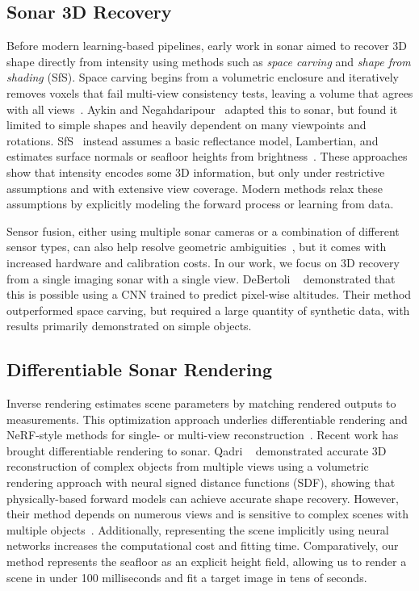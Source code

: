 \subsection{Sonar 3D Recovery}
Before modern learning-based pipelines, early work in sonar aimed to recover 3D shape directly from intensity using methods such as \textit{space carving} and \textit{shape from shading} (SfS). Space carving begins from a volumetric enclosure and iteratively removes voxels that fail multi-view consistency tests, leaving a volume that agrees with all views~\cite{Kutulakos1999SC}. Aykin and Negahdaripour~\cite{Aykin2015SC1, Aykin2017SC2} adapted this to sonar, but found it limited to simple shapes and heavily dependent on many viewpoints and rotations. SfS~\cite{Horn1970SfS} instead assumes a basic reflectance model, \eg Lambertian, and estimates surface normals or seafloor heights from brightness~\cite{Li1992SfS, Bikonis2013SfS1, Bikonis2013SfS2, Yakun2024SfS}. These approaches show that intensity encodes some 3D information, but only under restrictive assumptions and with extensive view coverage. Modern methods relax these assumptions by explicitly modeling the forward process or learning from data.

Sensor fusion, either using multiple sonar cameras or a combination of different sensor types, can also help resolve geometric ambiguities~\cite{Qadri2024AONeuS, Joe2019Fusion, Joe2022Fusion, Rho2025Fusion}, but it comes with increased hardware and calibration costs. In our work, we focus on 3D recovery from a single imaging sonar with a single view. DeBertoli \etal~\cite{DeBertoli2019ElevateNet} demonstrated that this is possible using a CNN trained to predict pixel-wise altitudes. Their method outperformed space carving, but required a large quantity of synthetic data, with results primarily demonstrated on simple objects.


\subsection{Differentiable Sonar Rendering}

Inverse rendering estimates scene parameters by matching rendered outputs to measurements. This optimization approach underlies differentiable rendering and NeRF-style methods for single- or multi-view reconstruction~\citep{Patow2003InvRendSurvey, Kato2020DiffRendSurvey, Mildenhall2020NeRF}. Recent work \citep{Qadri2022NeuSIS,Xie2022SSSDiff2, Bore2023SSSDiff, Reed2023SASDiff, Xie2022SSSDiff1,Xie2024BathymetryFLSDiff} has brought differentiable rendering to sonar. Qadri \etal~\citep{Qadri2022NeuSIS} demonstrated accurate 3D reconstruction of complex objects from multiple views using a volumetric rendering approach with neural signed distance functions (SDF), showing that physically-based forward models can achieve accurate shape recovery. However, their method depends on numerous views and is sensitive to complex scenes with multiple objects~\cite{Oliveira2025SES}. Additionally, representing the scene implicitly using neural networks increases the computational cost and fitting time. Comparatively, our method represents the seafloor as an explicit height field, allowing us to render a scene in under 100 milliseconds and fit a target image in tens of seconds. 

